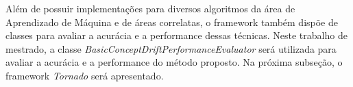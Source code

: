 \documentclass[msc, classic, a4paper]{ufbathesis}
\begin{document}
Além de possuir implementações para diversos algoritmos da área de Aprendizado de Máquina e de áreas correlatas, o framework também dispõe de classes para avaliar a acurácia e a performance dessas técnicas.
Neste trabalho de mestrado, a classe \textit{BasicConceptDriftPerformanceEvaluator} será utilizada para avaliar a acurácia e a performance do método proposto.
Na próxima subseção, o framework \textit{Tornado} será apresentado.




\end{document}
